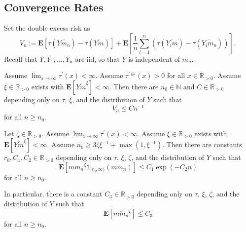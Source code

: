 \documentclass{article}
\newcommand{\N}{\mathbb{N}}
\newcommand{\R}{\mathbb{R}}
\newcommand{\Rpp}{\R_{>0}}
\newcommand{\lab}{\left[} %
\newcommand{\rab}{\right]} %
\newcommand{\ab}[1]{\lab #1 \rab} %
\newcommand{\abOf}[1]{\!\ab{#1}} %
\newcommand{\lb}{\left(} %
\newcommand{\rb}{\right)} %
\newcommand{\br}[1]{\lb #1 \rb} %
\newcommand{\brOf}[1]{\!\br{#1}} %
\newcommand{\E}{\mathbf{E}} %
\newcommand{\Eof}[1]{\E[#1]}
\newcommand{\EOf}[1]{\E\abOf{#1}}
\newcommand{\pr}{^\prime}
\newcommand{\ind}{\mathds{1}}%
\newcommand{\indOfOf}[2]{\ind_{\!#1}\!\brOf{#2}}%
\newcommand{\eqfs}{\,.}
\newcommand{\ol}[2]{\overline{#1#2}}
\newcommand{\tran}{\tau}
\newcommand{\dtran}{\tau\pr}
\newcommand{\ddrtran}{\tau^{\prime\oplus}}
\begin{document}
\subsection{Convergence Rates}
%
Set the double excess risk as
\begin{equation}
    V_n := \EOf{\tran(\ol Y{m_n}) - \tran(\ol Ym)} + \EOf{\frac1n \sum_{i=1}^n \br{\tran(\ol {Y_i}{m}) - \tran(\ol {Y_i}{m_n})} }
    \eqfs
\end{equation}
Recall that $Y, Y_1, \dots, Y_n$ are iid, so that $Y$ is independent of $m_n$.
%
\begin{proposition}\label{prp:posddrtran:Vn}
    Assume $\lim_{x\to\infty}\dtran(x) < \infty$.
    Assume $\ddrtran(x) > 0$ for all $x\in\Rpp$.
    Assume $\xi \in \Rpp$ exists with $\Eof{\ol Ym^\xi} < \infty$.
    Then there are $n_0 \in \N$ and $C \in \Rpp$ depending only on $\tran$, $\xi$, and the distribution of $Y$ such that
    \begin{equation}
        V_n \leq Cn^{-1}
    \end{equation}
    for all $n \geq n_0$.
\end{proposition}
%
\begin{lemma}\label{lmm:posddrtran:expect}
    Let $\zeta \in \Rpp$.
    Assume $\lim_{x\to\infty}\dtran(x) < \infty$.
    Assume $\xi \in \Rpp$ exists with $\Eof{\ol Ym^\xi} < \infty$.
    Assume $n_0 \geq 3\zeta\xi^{-1} + \max(1,\xi^{-1})$.
    Then there are constants $r_0, C_1, C_2\in\Rpp$ depending only on $\tran$, $\xi$, $\zeta$, and the distribution of $Y$ such that
    \begin{equation}
        \EOf{\ol m{m_n}^\zeta \indOfOf{[r_0, \infty)}{\ol m{m_n}}} \leq C_1 \exp\brOf{- C_2 n}
    \end{equation}
    for all $n \geq n_0$.
    
    In particular, there is a constant $C_3\in\Rpp$ depending only on $\tran$, $\xi$, $\zeta$, and the distribution of $Y$ such that
    \begin{equation}
        \EOf{\ol m{m_n}^\zeta} \leq C_3
    \end{equation}
    for all $n \geq n_0$.
\end{lemma}
%
\end{document}
